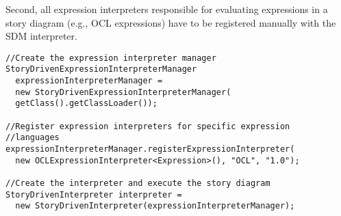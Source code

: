Second, all expression interpreters responsible for evaluating expressions in a story diagram (e.g., OCL expressions) have to be registered manually with the SDM interpreter.

\begin{verbatim}
//Create the expression interpreter manager
StoryDrivenExpressionInterpreterManager 
  expressionInterpreterManager = 
  new StoryDrivenExpressionInterpreterManager(
  getClass().getClassLoader());
	
//Register expression interpreters for specific expression 
//languages
expressionInterpreterManager.registerExpressionInterpreter(
  new OCLExpressionInterpreter<Expression>(), "OCL", "1.0");

//Create the interpreter and execute the story diagram
StoryDrivenInterpreter interpreter = 
  new StoryDrivenInterpreter(expressionInterpreterManager);
\end{verbatim}

